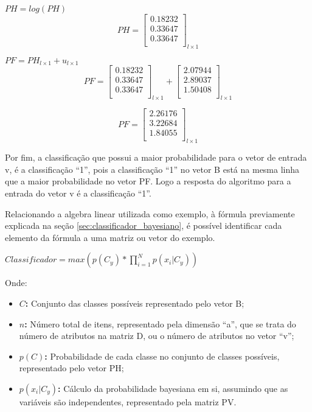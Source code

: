 \begin{anexosenv}
\begin{center}
$PH = log(PH)$
$$PH=\left[
\begin{array}{c}
0.18232 \\
0.33647 \\
0.33647 \\
\end{array}
\right]_{l \times 1}$$

$PF = PH_{l \times 1} + u_{l \times 1}$
$$PF=\left[
\begin{array}{c}
0.18232 \\
0.33647 \\
0.33647 \\
\end{array}
\right]_{l \times 1}
+
\left[
\begin{array}{c}
2.07944 \\
2.89037 \\
1.50408 \\
\end{array}
\right]_{l \times 1}
$$

$$PF=\left[
\begin{array}{c}
2.26176 \\
3.22684 \\
1.84055 \\
\end{array}
\right]_{l \times 1}
$$
\end{center}

Por fim, a classificação que possui a maior probabilidade para o vetor de
entrada v, é a classificação ``1'', pois a classificação ``1'' no vetor
B está na mesma linha que a maior probabilidade no vetor PF. Logo a resposta
do algoritmo para a entrada do vetor v é a classificação ``1''.

Relacionando a algebra linear utilizada como exemplo, à fórmula previamente
explicada na seção \ref{sec:classificador_bayesiano}, é possível identificar cada
elemento da fórmula a uma matriz ou vetor do exemplo.

$Classificador = max(p(C_{y})*\prod_{i=1}^{N}p(x_{i}|C_{y}))$

Onde:

\begin{itemize}
    \item \textbf{$C$:} Conjunto das classes possíveis representado pelo vetor B;
    \item \textbf{$n$: } Número total de itens, representado pela dimensão ``a'',
    que se trata do número de atributos na matriz D, ou o número de atributos
    no vetor ``v'';
    \item \textbf{$p(C)$: } Probabilidade de cada classe no conjunto de classes
    possíveis, representado pelo vetor PH;
    \item \textbf{$p(x_{i}|C_{y})$: } Cálculo da probabilidade bayesiana
    em si, assumindo que as variáveis são independentes, representado pela
    matriz PV.
\end{itemize}



\end{anexosenv}
